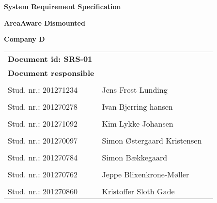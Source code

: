 
\centerline{\Huge\bfseries\color{ThemeColor} System Requirement Specification } 

\vspace{1em}
\centerline{\Large\bfseries\color{BlackColor} AreaAware Dismounted} 

\vspace{5em}
\centerline{\large\bfseries\color{BlackColor}Company D} 




\begin{center}
	\begin{tabular}{ l l p{6cm} }
		\textbf{Document id: SRS-01}& & \\
		\textbf{Document responsible}& & \\
		& & \\
		Stud. nr.: 201271234 & Jens Frost Lunding & \\\hline
		& & \\
		Stud. nr.: 201270278 & Ivan Bjerring hansen & \\\hline
		& & \\
		Stud. nr.: 201271092 & Kim Lykke Johansen & \\\hline
		& & \\	
		Stud. nr.: 201270097 & Simon Østergaard Kristensen & \\\hline
		& & \\
		Stud. nr.: 201270784  & Simon Bækkegaard & \\\hline
		& & \\
		Stud. nr.: 	201270762 & Jeppe Blixenkrone-Møller & \\\hline
		& & \\
		Stud. nr.: 	201270860 & Kristoffer Sloth Gade & \\\hline
	\end{tabular}     	
\end{center}
\thispagestyle{empty} %
\restoregeometry



		